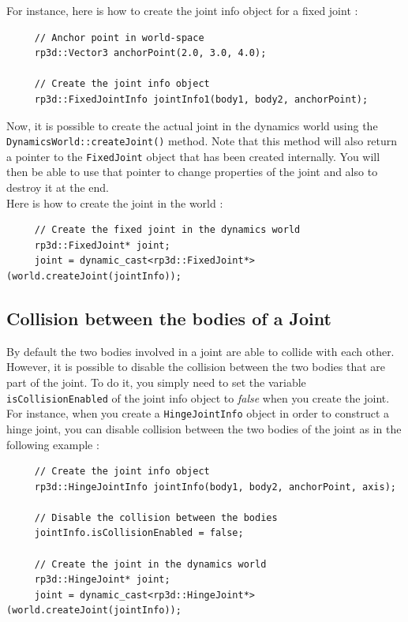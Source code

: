 \documentclass[a4paper,12pt]{article}
\begin{document}
    For instance, here is how to create the joint info object for a fixed joint : \\

    \begin{lstlisting}
     // Anchor point in world-space
     rp3d::Vector3 anchorPoint(2.0, 3.0, 4.0);

     // Create the joint info object
     rp3d::FixedJointInfo jointInfo1(body1, body2, anchorPoint);
  \end{lstlisting}

    \vspace{0.6cm}

    Now, it is possible to create the actual joint in the dynamics world using the \texttt{DynamicsWorld::createJoint()} method.
    Note that this method will also return a pointer to the \texttt{FixedJoint} object that has been created internally. You will then
    be able to use that pointer to change properties of the joint and also to destroy it at the end. \\

    Here is how to create the joint in the world : \\

    \begin{lstlisting}
     // Create the fixed joint in the dynamics world
     rp3d::FixedJoint* joint;
     joint = dynamic_cast<rp3d::FixedJoint*>(world.createJoint(jointInfo));
  \end{lstlisting}

    \subsection{Collision between the bodies of a Joint}

    By default the two bodies involved in a joint are able to collide with each other. However, it is possible to disable the collision between the two bodies that are part
    of the joint. To do it, you simply need to set the variable \texttt{isCollisionEnabled} of the joint info object to \emph{false} when you create the joint. \\

    For instance, when you create a \texttt{HingeJointInfo} object in order to construct a hinge joint, you can disable collision between the two bodies of the joint as in the
    following example : \\

    \begin{lstlisting}
     // Create the joint info object
     rp3d::HingeJointInfo jointInfo(body1, body2, anchorPoint, axis);

     // Disable the collision between the bodies
     jointInfo.isCollisionEnabled = false;

     // Create the joint in the dynamics world
     rp3d::HingeJoint* joint;
     joint = dynamic_cast<rp3d::HingeJoint*>(world.createJoint(jointInfo));
  \end{lstlisting}
\end{document}
